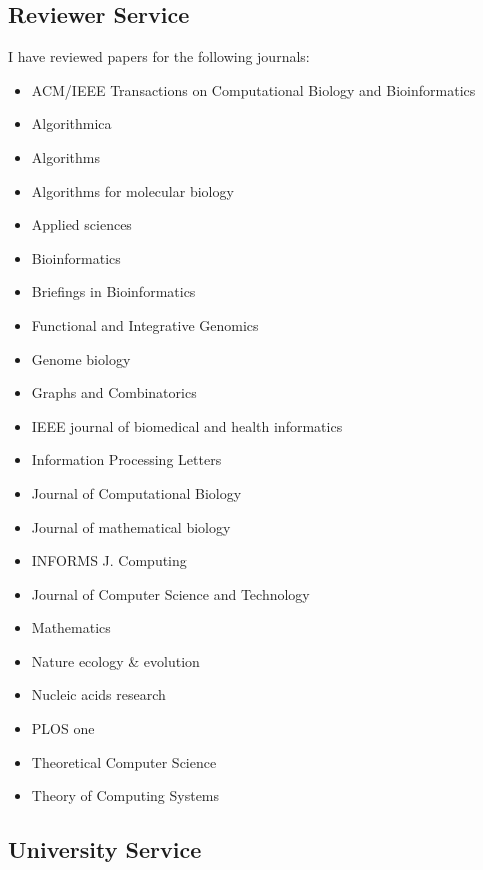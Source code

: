 \documentclass[11pt,a4paper,roman]{moderncv}
\begin{document}
\subsection{Reviewer Service}

I have reviewed papers for the following journals:
\begin{itemize}
	\item ACM/IEEE Transactions on Computational Biology and Bioinformatics
	\item Algorithmica
	\item Algorithms
	\item Algorithms for molecular biology
	\item Applied sciences
	\item Bioinformatics
	\item Briefings in Bioinformatics
	\item Functional and Integrative Genomics
	\item  Genome biology
	\item Graphs and Combinatorics
	\item IEEE journal of biomedical and health informatics
	\item Information Processing Letters
	\item Journal of Computational Biology
	\item  Journal of mathematical biology
	\item INFORMS J. Computing
	\item Journal of Computer Science and Technology
	\item Mathematics
	\item Nature ecology \& evolution
	\item Nucleic acids research
	\item PLOS one
	\item Theoretical Computer Science
	\item Theory of Computing Systems
\end{itemize}


\subsection{University Service}


\end{document}
